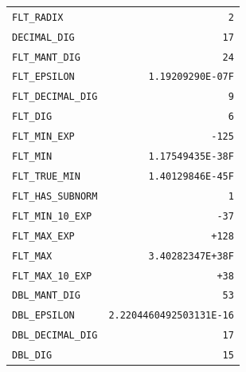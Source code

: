{\hspace*{2cm}\begin{tabular}{lr}
\texttt{FLT\_RADIX}&\hfil\hspace*{3cm}\texttt{2}\\
\texttt{DECIMAL\_DIG}&\hfil\hspace*{3cm}\texttt{17}\\
\texttt{FLT\_MANT\_DIG}&\hfil\hspace*{3cm}\texttt{24}\\
\texttt{FLT\_EPSILON}&\hfil\hspace*{3cm}\texttt{1.19209290E-07F}\\
\texttt{FLT\_DECIMAL\_DIG}&\hfil\hspace*{3cm}\texttt{9}\\
\texttt{FLT\_DIG}&\hfil\hspace*{3cm}\texttt{6}\\
\texttt{FLT\_MIN\_EXP}&\hfil\hspace*{3cm}\texttt{-125}\\
\texttt{FLT\_MIN}&\hfil\hspace*{3cm}\texttt{1.17549435E-38F}\\
\texttt{FLT\_TRUE\_MIN}&\hfil\hspace*{3cm}\texttt{1.40129846E-45F}\\
\texttt{FLT\_HAS\_SUBNORM}&\hfil\hspace*{3cm}\texttt{1}\\
\texttt{FLT\_MIN\_10\_EXP}&\hfil\hspace*{3cm}\texttt{-37}\\
\texttt{FLT\_MAX\_EXP}&\hfil\hspace*{3cm}\texttt{+128}\\
\texttt{FLT\_MAX}&\hfil\hspace*{3cm}\texttt{3.40282347E+38F}\\
\texttt{FLT\_MAX\_10\_EXP}&\hfil\hspace*{3cm}\texttt{+38}\\
\texttt{DBL\_MANT\_DIG}&\hfil\hspace*{3cm}\texttt{53}\\
\texttt{DBL\_EPSILON}&\hfil\hspace*{3cm}\texttt{2.2204460492503131E-16}\\
\texttt{DBL\_DECIMAL\_DIG}&\hfil\hspace*{3cm}\texttt{17}\\
\texttt{DBL\_DIG}&\hfil\hspace*{3cm}\texttt{15}\\

\end{tabular}}

